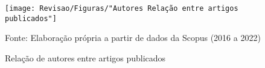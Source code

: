 \begin{figure}[htp!]
	\centering
	\caption{Relação de autores entre artigos publicados}
	\label{fig:autores-relacao-entre-artigos-publicados}
	\texttt{[image: Revisao/Figuras/"Autores Relação entre artigos publicados"]}
	\vspace{0.2cm}
	
	Fonte: Elaboração própria a partir de dados da Scopus (2016 a 2022)
\end{figure}